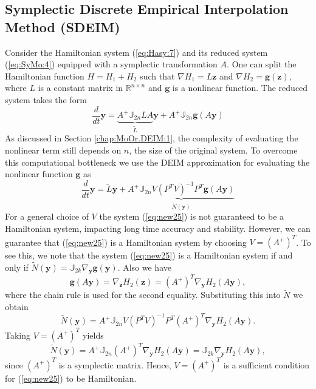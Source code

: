 \subsection{Symplectic Discrete Empirical Interpolation Method (SDEIM)} Consider the Hamiltonian system (\ref{eq:Hasy:7}) and its reduced system (\ref{eq:SyMo:4}) equipped with a symplectic transformation $A$. One can split the Hamiltonian function $H = H_1 + H_2$ such that $\nabla H_1 = L\mathbf z$ and $\nabla H_2 = \mathbf g(\mathbf z)$, where $L$ is a constant matrix in $\mathbb R^{n\times n}$ and $\mathbf g$ is a nonlinear function. The reduced system takes the form
\begin{equation} \label{eq:new24}
	\frac{d}{dt} \mathbf y = \underbrace{A^+ \mathbb J_{2n} L A}_{\tilde L} \mathbf y + A^+ \mathbb J_{2n} \mathbf g(A\mathbf y)
\end{equation}
As discussed in Section \ref{chap:MoOr.DEIM:1}, the complexity of evaluating the nonlinear term still depends on $n$, the size of the original system. To overcome this computational bottleneck we use the DEIM approximation for evaluating the nonlinear function $\mathbf g$ as
\begin{equation} \label{eq:new25}
	\frac{d}{dt} \mathbf y = \tilde L \mathbf y + \underbrace{ A^+ \mathbb J_{2n} V (P^TV)^{-1} P^T \mathbf g(A\mathbf y) }_{\tilde N(\mathbf y)}
\end{equation}
For a general choice of $V$ the system (\ref{eq:new25}) is not guaranteed to be a Hamiltonian system, impacting long time accuracy and stability. However, we can guarantee that (\ref{eq:new25}) is a Hamiltonian system by choosing $V=(A^+)^T$. To {\edit see this}, we note that the system (\ref{eq:new25}) is a Hamiltonian system if and only if $\tilde N(\mathbf y) = \mathbb J_{2k} \nabla_{\mathbf y} \mathbf g(\mathbf y)$. Also we have 
\begin{equation} \label{eq:new26}
	\mathbf g(A\mathbf y) = \nabla_{\mathbf z} H_2(\mathbf z) = (A^+)^T \nabla_{\mathbf y} H_2(A \mathbf y),
\end{equation}
where the chain rule is used for the second equality. Substituting this into $\tilde N$ we obtain
\begin{equation} \label{eq:new27}
	\tilde N(\mathbf y)= A^+ \mathbb J_{2n} V (P^TV)^{-1} P^T  (A^+)^T \nabla_{\mathbf y} H_2(A \mathbf y).
\end{equation}
Taking $V = (A^+)^T$ yields
\begin{equation} \label{eq:new28}
	\tilde N(\mathbf y) = A^+ \mathbb J_{2n}(A^+)^T \nabla_{\mathbf y} H_2(A \mathbf y) = \mathbb J_{2k} \nabla_{\mathbf y} H_2(A \mathbf y),
\end{equation}
since $(A^+)^T$ is a symplectic matrix. Hence, $V = (A^+)^T$ is a sufficient condition for (\ref{eq:new25}) to {\edit be Hamiltonian}. 

